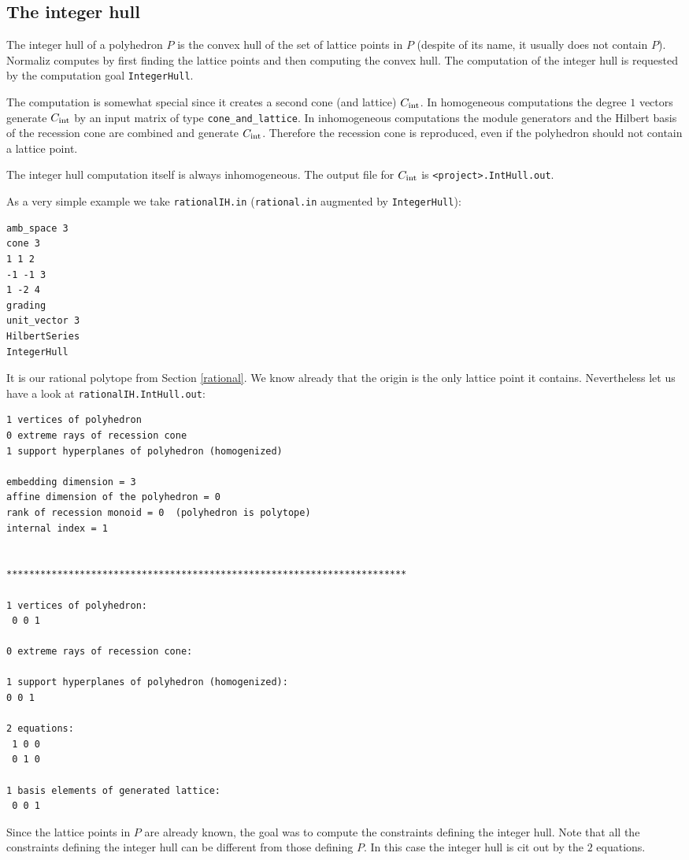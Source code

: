 \documentclass[12pt,a4paper]{scrartcl}
\theoremstyle{definition}
\begin{document}
\subsection{The integer hull}\label{IntHull}

The integer hull of a polyhedron $P$ is the convex hull of the set of lattice points in $P$ (despite of its name, it usually does not contain $P$). Normaliz computes by first finding the lattice points and then computing the convex hull. The computation of the integer hull is requested by the computation goal \verb|IntegerHull|.

The computation is somewhat special since it creates a second cone (and lattice) $C_\textup{int}$. In homogeneous computations the degree $1$ vectors generate $C_\textup{int}$ by an input matrix of type \verb|cone_and_lattice|. In inhomogeneous computations the module generators and the Hilbert basis of the recession cone are combined and generate $C_\textup{int}$. Therefore the recession cone is reproduced, even if the polyhedron should not contain a lattice point.

The integer hull computation itself is always inhomogeneous. The output file for $C_\textup{int}$ is \verb|<project>.IntHull.out|.

As a very simple example we take \verb|rationalIH.in| (\verb|rational.in| augmented by \verb|IntegerHull|):
\begin{Verbatim}
amb_space 3
cone 3
1 1 2
-1 -1 3
1 -2 4
grading
unit_vector 3
HilbertSeries
IntegerHull
\end{Verbatim}
It is our rational polytope from Section \ref{rational}. We know already that the origin is the only lattice point it contains. Nevertheless let us have a look at \verb|rationalIH.IntHull.out|:

\begin{Verbatim}
1 vertices of polyhedron
0 extreme rays of recession cone
1 support hyperplanes of polyhedron (homogenized)

embedding dimension = 3
affine dimension of the polyhedron = 0
rank of recession monoid = 0  (polyhedron is polytope)
internal index = 1


***********************************************************************

1 vertices of polyhedron:
 0 0 1

0 extreme rays of recession cone:

1 support hyperplanes of polyhedron (homogenized):
0 0 1

2 equations:
 1 0 0
 0 1 0

1 basis elements of generated lattice:
 0 0 1
\end{Verbatim}
Since the lattice points in $P$ are already known, the goal was to compute the constraints defining the integer hull. Note that all the constraints defining the integer hull can be different from those defining $P$. In this case the integer hull is cit out by the $2$ equations.
\end{document}
